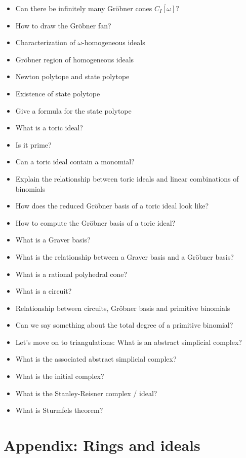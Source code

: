 \documentclass[a4paper, 11pt]{article}
\begin{document}
\begin{itemize}
  \item Can there be infinitely many Gröbner cones \( \overline{C_I[\omega]}? \)
  \item How to draw the Gröbner fan?
  \item Characterization of \( \omega \)-homogeneous ideals
  \item Gröbner region of homogeneous ideals
  \item Newton polytope and state polytope
  \item Existence of state polytope
  \item Give a formula for the state polytope
  \item What is a toric ideal?
  \item Is it prime? 
  \item Can a toric ideal contain a monomial?
  \item Explain the relationship between toric ideals and linear combinations of binomials
  \item How does the reduced Gröbner basis of a toric ideal look like?
  \item How to compute the Gröbner basis of a toric ideal?
  \item What is a Graver basis?
  \item What is the relationship between a Graver basis and a Gröbner basis?
  \item What is a rational polyhedral cone?
  \item What is a circuit?
  \item Relationship between circuits, Gröbner basis and primitive binomials
  \item Can we say something about the total degree of a primitive binomial?
  \item Let's move on to triangulations: What is an abstract simplicial complex?
  \item What is the associated abstract simplicial complex? 
  \item What is the initial complex?
  \item What is the Stanley-Reisner complex / ideal?
  \item What is Sturmfels theorem?
\end{itemize}


\appendix

\clearpage
\section{Appendix: Rings and ideals}
\end{document}
